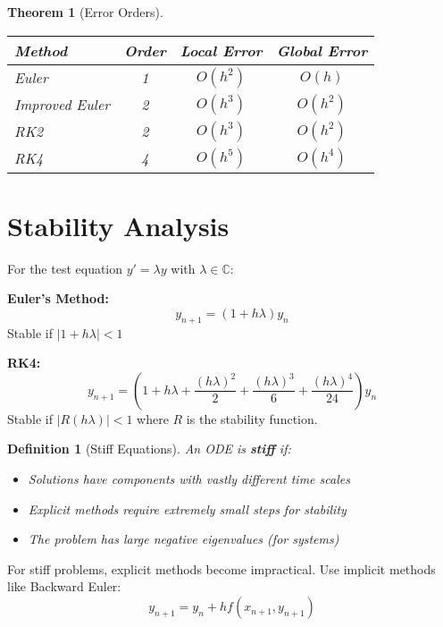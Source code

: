\documentclass[12pt]{article}
\newtheorem{definition}{Definition}
\newtheorem{theorem}{Theorem}
\begin{document}
\begin{theorem}[Error Orders]
\begin{center}
\begin{tabular}{|l|c|c|c|}
\hline
\textbf{Method} & \textbf{Order} & \textbf{Local Error} & \textbf{Global Error} \\
\hline
Euler & 1 & $O(h^{2})$ & $O(h)$ \\
Improved Euler & 2 & $O(h^{3})$ & $O(h^{2})$ \\
RK2 & 2 & $O(h^{3})$ & $O(h^{2})$ \\
RK4 & 4 & $O(h^{5})$ & $O(h^{4})$ \\
\hline
\end{tabular}
\end{center}
\end{theorem}

\section{Stability Analysis}

\begin{stability}
For the test equation $y' = \lambda y$ with $\lambda \in \mathbb{C}$:

\textbf{Euler's Method:}
$$y_{n+1} = (1 + h\lambda)y_{n}$$
Stable if $|1 + h\lambda| < 1$

\textbf{RK4:}
$$y_{n+1} = \left(1 + h\lambda + \frac{(h\lambda)^{2}}{2} + \frac{(h\lambda)^{3}}{6} + \frac{(h\lambda)^{4}}{24}\right)y_{n}$$
Stable if $|R(h\lambda)| < 1$ where $R$ is the stability function.
\end{stability}

\begin{definition}[Stiff Equations]
An ODE is \textbf{stiff} if:
\begin{itemize}
\item Solutions have components with vastly different time scales
\item Explicit methods require extremely small steps for stability
\item The problem has large negative eigenvalues (for systems)
\end{itemize}
\end{definition}

\begin{warning}
For stiff problems, explicit methods become impractical. Use implicit methods like Backward Euler:
$$y_{n+1} = y_{n} + hf(x_{n+1}, y_{n+1})$$
\end{warning}
\end{document}
